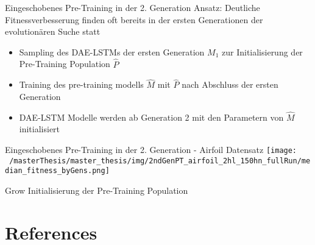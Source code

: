 \documentclass[
  ignorenonframetext,
]{beamer}
\providecommand{\tightlist}{%
  \setlength{\itemsep}{0pt}\setlength{\parskip}{0pt}}
\begin{document}
\begin{frame}{Eingeschobenes Pre-Training in der 2. Generation}
\protect\hypertarget{eingeschobenes-pre-training-in-der-2.-generation}{}
Ansatz: Deutliche Fitnessverbesserung finden oft bereits in der ersten
Generationen der evolutionären Suche statt

\begin{itemize}
\tightlist
\item
  Sampling des DAE-LSTMs der ersten Generation \(M_1\) zur
  Initialisierung der Pre-Training Population \(\hat{P}\)
\item
  Training des pre-training modells \(\hat{M}\) mit \(\hat{P}\) nach
  Abschluss der ersten Generation
\item
  DAE-LSTM Modelle werden ab Generation 2 mit den Parametern von
  \(\hat{M}\) initialisiert
\end{itemize}
\end{frame}

\begin{frame}{Eingeschobenes Pre-Training in der 2. Generation - Airfoil
Datensatz}
\protect\hypertarget{eingeschobenes-pre-training-in-der-2.-generation---airfoil-datensatz}{}
\texttt{[image: ~/masterThesis/master\_thesis/img/2ndGenPT\_airfoil\_2hl\_150hn\_fullRun/median\_fitness\_byGens.png]}
\end{frame}

\begin{frame}{Grow Initialisierung der Pre-Training Population}
\protect\hypertarget{grow-initialisierung-der-pre-training-population}{}
\end{frame}

\hypertarget{references}{%
\section*{References}\label{references}}
\end{document}
